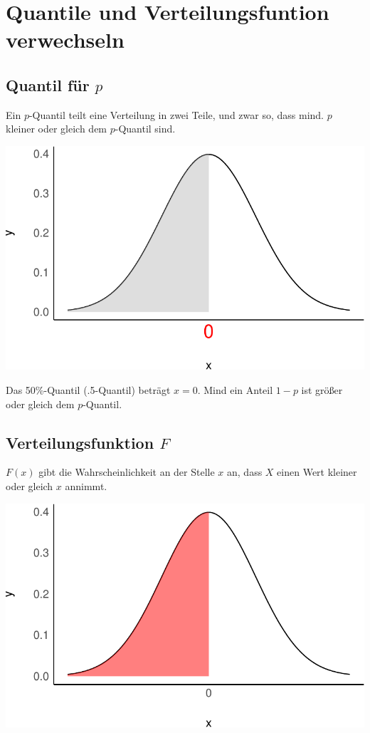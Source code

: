 \documentclass[
  a4paper,
  DIV=11]{scrreprt}
\theoremstyle{definition}
\theoremstyle{remark}
\begin{document}
\hypertarget{quantile-und-verteilungsfuntion-verwechseln}{%
\section{Quantile und Verteilungsfuntion verwechseln
🤷}\label{quantile-und-verteilungsfuntion-verwechseln}}

\hypertarget{quantil-fuxfcr-p}{%
\subsection{\texorpdfstring{Quantil für
\(p\)}{Quantil für p}}\label{quantil-fuxfcr-p}}

Ein \(p\)-Quantil teilt eine Verteilung in zwei Teile, und zwar so, dass
mind. \(p\) kleiner oder gleich dem \(p\)-Quantil sind.

\includegraphics{./abschluss_files/figure-pdf/quantil-plot-1.pdf}

Das 50\%-Quantil (.5-Quantil) beträgt \(x=0\). Mind ein Anteil \(1-p\)
ist größer oder gleich dem \(p\)-Quantil.

\hypertarget{verteilungsfunktion-f}{%
\subsection{\texorpdfstring{Verteilungsfunktion
\(F\)}{Verteilungsfunktion F}}\label{verteilungsfunktion-f}}

\(F(x)\) gibt die Wahrscheinlichkeit an der Stelle \(x\) an, dass \(X\)
einen Wert kleiner oder gleich \(x\) annimmt.

\includegraphics{./abschluss_files/figure-pdf/f-plot-1.pdf}
\end{document}
